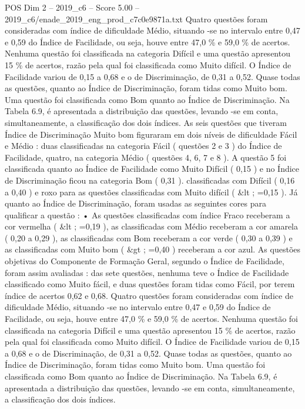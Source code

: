 \begin{textsample}{POS Dim 2 – 2019\_c6 – Score 5.00 – 2019\_c6/enade\_2019\_eng\_prod\_c7c0e9871a.txt}
Quatro questões foram consideradas com índice de dificuldade Médio, situando -se no intervalo entre 0,47 e 0,59 do Índice de Facilidade, ou seja, houve entre 47,0 \% e 59,0 \% de acertos.
Nenhuma questão foi classificada na categoria Difícil e uma questão apresentou 15 \% de acertos, razão pela qual foi classificada como Muito difícil.
O Índice de Facilidade variou de 0,15 a 0,68 e o de Discriminação, de 0,31 a 0,52.
Quase todas as questões, quanto ao Índice de Discriminação, foram tidas como Muito bom.
Uma questão foi classificada como Bom quanto ao Índice de Discriminação.
Na Tabela 6.9, é apresentada a distribuição das questões, levando -se em conta, simultaneamente, a classificação dos dois índices.
As seis questões que tiveram Índice de Discriminação Muito bom figuraram em dois níveis de dificuldade Fácil e Médio : duas classificadas na categoria Fácil ( questões 2 e 3 ) do Índice de Facilidade, quatro, na categoria Médio ( questões 4, 6, 7 e 8 ).
A questão 5 foi classificada quanto ao Índice de Facilidade como Muito Difícil ( 0,15 ) e no Índice de Discriminação ficou na categoria Bom ( 0,31 ). classificadas com Difícil ( 0,16 a 0,40 ) e roxo para as questões classificadas com Muito difícil ( \&lt ; =0,15 ).
Já quanto ao Índice de Discriminação, foram usadas as seguintes cores para qualificar a questão : • As questões classificadas com índice Fraco receberam a cor vermelha ( \&lt ; =0,19 ), as classificadas com Médio receberam a cor amarela ( 0,20 a 0,29 ), as classificadas com Bom receberam a cor verde ( 0,30 a 0,39 ) e as classificadas com Muito bom ( \&gt ; =0,40 ) receberam a cor azul.
As questões objetivas do Componente de Formação Geral, segundo o Índice de Facilidade, foram assim avaliadas : das sete questões, nenhuma teve o Índice de Facilidade classificado como Muito fácil, e duas questões foram tidas como Fácil, por terem índice de acertos 0,62 e 0,68.
Quatro questões foram consideradas com índice de dificuldade Médio, situando -se no intervalo entre 0,47 e 0,59 do Índice de Facilidade, ou seja, houve entre 47,0 \% e 59,0 \% de acertos.
Nenhuma questão foi classificada na categoria Difícil e uma questão apresentou 15 \% de acertos, razão pela qual foi classificada como Muito difícil.
O Índice de Facilidade variou de 0,15 a 0,68 e o de Discriminação, de 0,31 a 0,52.
Quase todas as questões, quanto ao Índice de Discriminação, foram tidas como Muito bom.
Uma questão foi classificada como Bom quanto ao Índice de Discriminação.
Na Tabela 6.9, é apresentada a distribuição das questões, levando -se em conta, simultaneamente, a classificação dos dois índices.

\end{textsample}

